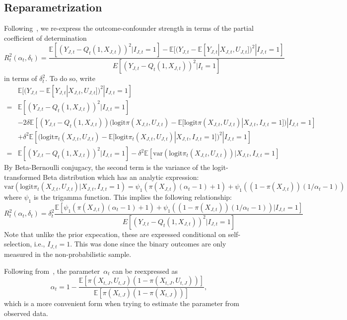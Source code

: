 \documentclass[11pt]{amsart}
\numberwithin{equation}{section}
\theoremstyle{plain}
\def\logit{\text{logit}}
\def\EE{\mathbb{E}}
\begin{document}
\subsection{Reparametrization}

Following~\cite{Veitch2020}, we re-express the outcome-confounder strength in terms of the partial coefficient of determination
$$
R_t^2 (\alpha_t, \delta_t) = \frac{\EE [( Y_{J,t} - Q_t(1,X_{J,t}) )^2 | I_{J,t}=1 ] - \EE[ (Y_{J,t} - \EE[ Y_{J,t} | X_{J,t}, U_{J,t} ])^2 | I_{J,t} = 1]}{E[(Y_{J,t} - Q_t(1,X_{J,t}))^2 | I_t = 1]}
$$
in terms of $\delta_t^2$. To do so, write
\begin{align*}
&\EE [ (Y_{J,t} - \EE[ Y_{J,t} | X_{J,t}, U_{J,t}] )^2 | I_{J,t} = 1 ] \\
= &\EE [ (Y_{J,t} - Q_t(1,X_{J,t}))^2 | I_{J,t} = 1 ] \\
&- 2 \delta \EE \left[ (Y_{J,t} - Q_t(1,X_{J,t})) (\logit \pi(X_{J,t},U_{J,t}) - \EE[ \logit \pi (X_{J,t},U_{J,t}) | X_{J,t}, I_{J,t}=1 ]) | I_{J,t} = 1 \right] \\
&+ \delta^2 \EE \left[ (\logit \pi_t(X_{J,t},U_{J,t}) - \EE[ \logit \pi_t (X_{J,t},U_{J,t}) | X_{J,t}, I_{J,t}=1 ])^2 | I_{J,t} = 1 \right] \\
= &\EE [ (Y_{J,t} - Q_t(1,X_{J,t}))^2 | I_{J,t} = 1 ] - \delta^2 \EE \left[ \text{var} \left( \logit \pi_t(X_{J,t},U_{J,t}) \right) | X_{J,t}, I_{J,t} = 1 \right]
\end{align*}
By Beta-Bernoulli conjugacy, the second term is the variance of the logit-transformed Beta distribution which has an analytic expression:
$$
\text{var} \left( \logit \pi_t(X_{J,t},U_{J,t}) | X_{J,t}, I_{J,t} = 1 \right) = \psi_1 ( \pi(X_{J,t}) (\alpha_t - 1) + 1 ) + \psi_1 ( (1- \pi(X_{J,t})) (1/\alpha_t - 1))
$$
where $\psi_1$ is the trigamma function. This implies the following relationship:
\begin{equation}
\label{eq:partialcoef}
R_t^2 (\alpha_t, \delta_t) = \delta_t^2 \frac{\EE [\psi_1 ( \pi(X_{J,t}) (\alpha_t - 1) + 1 ) + \psi_1 ( (1- \pi(X_{J,t})) (1/\alpha_t - 1)) | I_{J,t} = 1 ] }{E [(Y_{J,t}- Q_t(1,X_{J,t}))^2 | I_{J,t} = 1]}
\end{equation}
Note that unlike the prior expecation, these are expressed conditional on self-selection, i.e., $I_{J,t} = 1$.  This was done since the binary outcomes are only measured in the non-probabilistic sample.

Following from~\cite[Theorem 5]{Veitch2020}, the parameter~$\alpha_t$ can be reexpressed as
\begin{equation}
\label{eq:alphaest}
\alpha_t = 1 - \frac{\EE \left[ \pi (X_{t,J},U_{t,J}) \left( 1 - \pi (X_{t,J},U_{t,J}) \right)  \right]}{\EE\left[ \pi (X_{t,J}) \left( 1 - \pi (X_{t,J}) \right) \right] },
\end{equation}
which is a more convenient form when trying to estimate the parameter from observed data.
\end{document}
